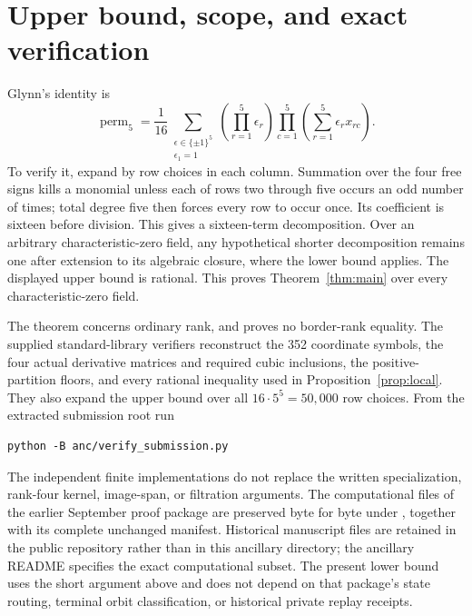 \documentclass[11pt]{amsart}
\theoremstyle{definition}
\numberwithin{equation}{section}
\newcommand{\perm}{\operatorname{perm}}
\begin{document}
\section{Upper bound, scope, and exact verification}
Glynn's identity \cite{Glynn2010} is
\[
 \perm_5=\frac1{16}
 \sum_{\substack{\epsilon\in\{\pm1\}^5\\\epsilon_1=1}}
 \left(\prod_{r=1}^5\epsilon_r\right)
 \prod_{c=1}^5\left(\sum_{r=1}^5\epsilon_rx_{rc}\right).
\]
To verify it, expand by row choices in each column. Summation over the four
free signs kills a monomial unless each of rows two through five occurs an
odd number of times; total degree five then forces every row to occur once.
Its coefficient is sixteen before division. This gives a sixteen-term
decomposition. Over an arbitrary characteristic-zero field, any hypothetical
shorter decomposition remains one after extension to its algebraic closure,
where the lower bound applies. The displayed upper bound is rational.
This proves Theorem~\ref{thm:main} over every characteristic-zero field.

The theorem concerns ordinary rank, and proves no border-rank equality.
The supplied standard-library verifiers reconstruct the 352 coordinate
symbols, the four actual derivative matrices and required cubic inclusions,
the positive-partition floors, and every rational inequality used in
Proposition~\ref{prop:local}. They also expand the upper bound over all
\(16\cdot5^5=50{,}000\) row choices. From the extracted submission root run
\begin{verbatim}
python -B anc/verify_submission.py
\end{verbatim}
The independent finite implementations do not replace the written
specialization, rank-four kernel, image-span, or filtration arguments.
The computational files of the earlier September proof package are
preserved byte for byte under , together with its complete
unchanged manifest. Historical manuscript files are retained in the public
repository rather than in this ancillary directory; the ancillary README
specifies the exact computational subset. The present lower bound uses the
short argument above and does not depend on that package's state routing,
terminal orbit classification, or historical private replay receipts.

\appendix
\end{document}
